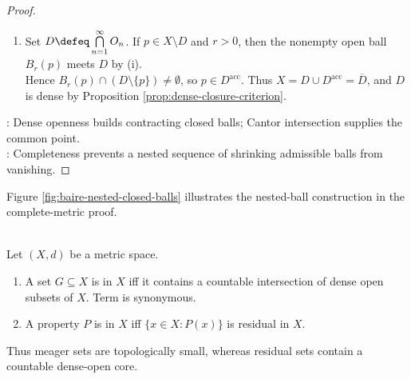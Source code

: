 \begin{theorem}
\begin{proof}
\begin{enumerate}[label=(\roman*)]
\begin{enumerate}[label=(\alph*)]
\end{enumerate}
\item Set $D\defeq\bigcap\limits_{n=1}^{\infty}O_n$. If $p\in X\setminus D$ and $r>0$, then the nonempty open ball $B_r(p)$ meets $D$ by (i).\\
Hence $B_r(p)\cap(D\setminus\{p\})\ne\emptyset$, so $p\in D^{\operatorname{acc}}$. Thus $X=D\cup D^{\operatorname{acc}}=\overline{D}$, and $D$ is dense by Proposition \ref{prop:dense-closure-criterion}.
\end{enumerate}
: Dense openness builds contracting closed balls; Cantor intersection supplies the common point.\\
: Completeness prevents a nested sequence of shrinking admissible balls from vanishing.
\end{proof}
\end{theorem}

Figure \ref{fig:baire-nested-closed-balls} illustrates the nested-ball construction in the complete-metric proof.
\begin{illustrationfigure}[H]
  \centering
  
  \caption{Nested closed balls $C_1\supseteq C_2\supseteq C_3$ lie in $U$; filled dots are their centers, and $p$ is their common point.}
  \label{fig:baire-nested-closed-balls}
\end{illustrationfigure}

\begin{definition} \label{def:residual-thick-generic-set} \\
Let $(X,d)$ be a metric space.
\begin{enumerate}[label=(\roman*)]
\setlength{\itemsep}{0pt}
\item A set $G\subseteq X$ is  in $X$ iff it contains a countable intersection of dense open subsets of $X$. Term  is synonymous.
\item A property $P$ is  in $X$ iff $\{x\in X:P(x)\}$ is residual in $X$.
\end{enumerate}
Thus meager sets are topologically small, whereas residual sets contain a countable dense-open core.
\end{definition}

